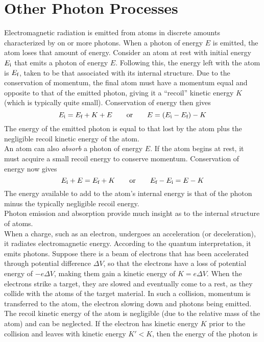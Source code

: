\documentclass{subfiles}
\begin{document}
	\section{Other Photon Processes}
			Electromagnetic radiation is emitted from atoms in discrete amounts characterized by on or more photons. When a photon of energy \(E\) is emitted, the atom loses that amount of energy. Consider an atom at rest with initial energy \(E_{\text{i}}\) that emits a photon of energy \(E\). Following this, the energy left with the atom is \(E_{\text{f}}\), taken to be that associated with its internal structure. Due to the conservation of momentum, the final atom must have a momentum equal and opposite to that of the emitted photon, giving it a \enquote{recoil} kinetic energy \(K\) (which is typically quite small). Conservation of energy then gives
				\[
					E_{\text{i}} = E_{\text{f}} + K + E \qquad \text{or} \qquad
						E = (E_{\text{i}} - E_{\text{f}}) - K
				\]
				The energy of the emitted photon is equal to that lost by the atom plus the negligible recoil kinetic energy of the atom. \\
				An atom can also \textit{absorb} a photon of energy \(E\). If the atom begins at rest, it must acquire a small recoil energy to conserve momentum. Conservation of energy now gives
				\[
					E_{\text{i}} + E = E_{\text{f}} + K \qquad \text{or} \qquad
						E_{\text{f}} - E_{\text{i}} = E - K
				\]
				The energy available to add to the atom's internal energy is that of the photon minus the typically negligible recoil energy. \\
				Photon emission and absorption provide much insight as to the internal structure of atoms. \\
			When a charge, such as an electron, undergoes an acceleration (or deceleration), it radiates electromagnetic energy. According to the quantum interpretation, it emits photons. Suppose there is a beam of electrons that has been accelerated through potential difference \(\Delta V\), so that the electrons have a loss of potential energy of \(-e\Delta V\), making them gain a kinetic energy of \(K = e\Delta V\). When the electrons strike a target, they are slowed and eventually come to a rest, as they collide with the atoms of the target material. In such a collision, momentum is transferred to the atom, the electron slowing down and photons being emitted. The recoil kinetic energy of the atom is negligible (due to the relative mass of the atom) and can be neglected. If the electron has kinetic energy \(K\) prior to the collision and leaves with kinetic energy \(K' < K\), then the energy of the photon is
\end{document}
